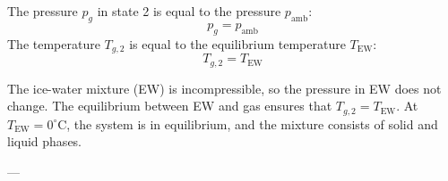 The pressure \( p_g \) in state 2 is equal to the pressure \( p_{\text{amb}} \):  
\[
p_g = p_{\text{amb}}
\]  
The temperature \( T_{g,2} \) is equal to the equilibrium temperature \( T_{\text{EW}} \):  
\[
T_{g,2} = T_{\text{EW}}
\]  

The ice-water mixture (EW) is incompressible, so the pressure in EW does not change. The equilibrium between EW and gas ensures that \( T_{g,2} = T_{\text{EW}} \). At \( T_{\text{EW}} = 0^\circ\text{C} \), the system is in equilibrium, and the mixture consists of solid and liquid phases.  

---